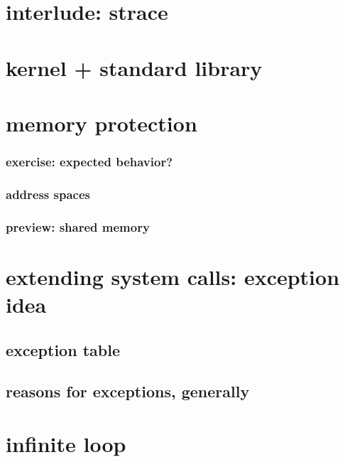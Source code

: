 \section{interlude: strace}


\section{kernel + standard library}

\section{memory protection}

\subsubsection{exercise: expected behavior?}


\subsubsection{address spaces}


\subsubsection{preview: shared memory}


\section{extending system calls: exception idea}


\subsection{exception table}


\subsection{reasons for exceptions, generally}



\section{infinite loop}


